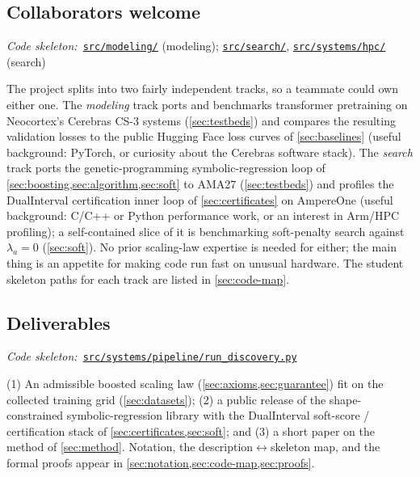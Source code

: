 \documentclass[11pt]{article}
\newcommand{\repoBlob}{https://github.com/krichelj/ByteBoost-Shape-Constrained-Boosted-SR/blob/main/}
\newcommand{\repoTree}{https://github.com/krichelj/ByteBoost-Shape-Constrained-Boosted-SR/tree/main/}
\newcommand{\pyFile}[1]{\href{\repoBlob#1}{\nolinkurl{#1}}}
\newcommand{\pyDir}[1]{\href{\repoTree#1}{\nolinkurl{#1/}}}
\newcommand{\codeRef}[1]{%
  \par\nobreak\noindent
  {\footnotesize\textit{Code skeleton:}~#1}\par\smallskip}
\theoremstyle{plain}
\theoremstyle{remark}
\begin{document}
\subsection{Collaborators welcome}\label{sec:collaborators}
\codeRef{\pyDir{src/modeling} (modeling); \pyDir{src/search}, \pyDir{src/systems/hpc} (search)}
The project splits into two fairly independent tracks, so a teammate could own either one.
The \emph{modeling} track ports and benchmarks transformer pretraining on Neocortex's Cerebras CS-3 systems (\cref{sec:testbeds}) and compares the resulting validation losses to the public Hugging Face loss curves of \cref{sec:baselines} (useful background: PyTorch, or curiosity about the Cerebras software stack).
The \emph{search} track ports the genetic-programming symbolic-regression loop of \cref{sec:boosting,sec:algorithm,sec:soft} to AMA27 (\cref{sec:testbeds}) and profiles the DualInterval certification inner loop of \cref{sec:certificates} on AmpereOne (useful background: C/C++ or Python performance work, or an interest in Arm/HPC profiling); a self-contained slice of it is benchmarking soft-penalty search against $\lambda_a=0$ (\cref{sec:soft}).
No prior scaling-law expertise is needed for either; the main thing is an appetite for making code run fast on unusual hardware.
The student skeleton paths for each track are listed in \cref{sec:code-map}.

\subsection{Deliverables}\label{sec:deliverables}
\codeRef{\pyFile{src/systems/pipeline/run_discovery.py}}
(1) An admissible boosted scaling law (\cref{sec:axioms,sec:guarantee}) fit on the collected training grid (\cref{sec:datasets}); (2) a public release of the shape-constrained symbolic-regression library with the DualInterval soft-score / certification stack of \cref{sec:certificates,sec:soft}; and (3) a short paper on the method of \cref{sec:method}.
Notation, the description$\leftrightarrow$skeleton map, and the formal proofs appear in \cref{sec:notation,sec:code-map,sec:proofs}.

\clearpage
\renewcommand{\refname}{References}
\renewcommand{\bibsection}{\section{\refname}}



\clearpage
\appendix
\end{document}
